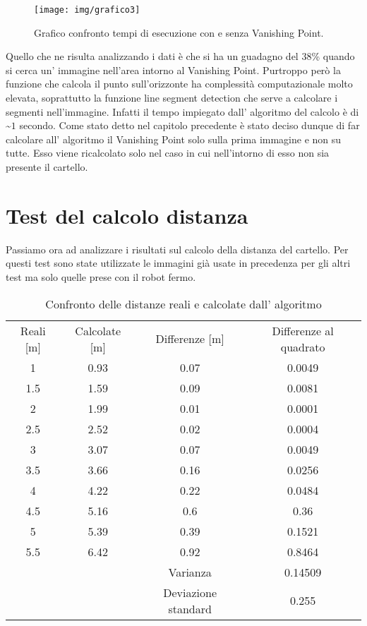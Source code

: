	\begin{figure}[!ht]
		\centering
		\texttt{[image: img/grafico3]}
		\caption[Grafico tempi di esecuzione]{Grafico confronto tempi di esecuzione con e senza Vanishing Point.}
	\end{figure}

	Quello che ne risulta analizzando i dati è che si ha un guadagno del 38\% quando si cerca un' immagine nell'area intorno al Vanishing Point. Purtroppo però la funzione che calcola il punto sull'orizzonte ha complessità computazionale molto elevata, soprattutto la funzione line segment detection che serve a calcolare i segmenti nell'immagine. Infatti il tempo impiegato dall' algoritmo del calcolo è di \textasciitilde $1$ secondo. Come stato detto nel capitolo precedente è stato deciso dunque di far calcolare all' algoritmo il Vanishing Point solo sulla prima immagine e non su tutte. Esso viene ricalcolato solo nel caso in cui nell'intorno di esso non sia presente il cartello.

\section{Test del calcolo distanza}

	Passiamo ora ad analizzare i risultati sul calcolo della distanza del cartello. Per questi test sono state utilizzate le immagini già usate in precedenza per gli altri test ma solo quelle prese con il robot fermo.

	\begin{table}[h]
		\centering
		\begin{tabular}{cccc}
		    Reali [m] & Calcolate [m] & Differenze [m] & Differenze al quadrato \\
			1 	&   0.93	& 0.07		& 0.0049    	\\
			1.5 &   1.59    & 0.09 		& 0.0081 		\\
			2 	& 	1.99	& 0.01		& 0.0001 		\\
			2.5 &   2.52	& 0.02		& 0.0004		\\
			3	&   3.07	& 0.07		& 0.0049		\\
			3.5 &   3.66	& 0.16		& 0.0256		\\
			4 	&   4.22	& 0.22		& 0.0484		\\
			4.5 &   5.16	& 0.6		& 0.36			\\
			5 	&   5.39	& 0.39		& 0.1521		\\
			5.5 &   6.42	& 0.92		& 0.8464		\\
			\hline
			& & Varianza & 0.14509 \\
			& & Deviazione standard & 0.255 \\

		\end{tabular}
		\caption{Confronto delle distanze reali e calcolate dall' algoritmo}
	\end{table}


